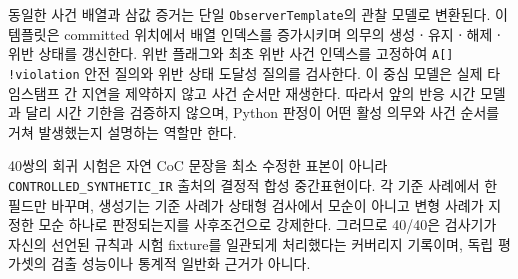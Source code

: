 동일한 사건 배열과 삼값 증거는 단일 \texttt{ObserverTemplate}의 \uppaal 관찰 모델로 변환된다. 이 템플릿은 committed 위치에서 배열 인덱스를 증가시키며 의무의 생성ㆍ유지ㆍ해제ㆍ위반 상태를 갱신한다. 위반 플래그와 최초 위반 사건 인덱스를 고정하여 \texttt{A[] !violation} 안전 질의와 위반 상태 도달성 질의를 검사한다. 이 중심 모델은 실제 타임스탬프 간 지연을 제약하지 않고 사건 순서만 재생한다. 따라서 앞의 반응 시간 모델과 달리 시간 기한을 검증하지 않으며, Python 판정이 어떤 활성 의무와 사건 순서를 거쳐 발생했는지 설명하는 역할만 한다.

40쌍의 회귀 시험은 자연 CoC 문장을 최소 수정한 표본이 아니라 \texttt{CONTROLLED\_SYNTHETIC\_IR} 출처의 결정적 합성 중간표현이다. 각 기준 사례에서 한 필드만 바꾸며, 생성기는 기준 사례가 상태형 검사에서 모순이 아니고 변형 사례가 지정한 모순 하나로 판정되는지를 사후조건으로 강제한다. 그러므로 40/40은 검사기가 자신의 선언된 규칙과 시험 fixture를 일관되게 처리했다는 커버리지 기록이며, 독립 평가셋의 검출 성능이나 통계적 일반화 근거가 아니다.
